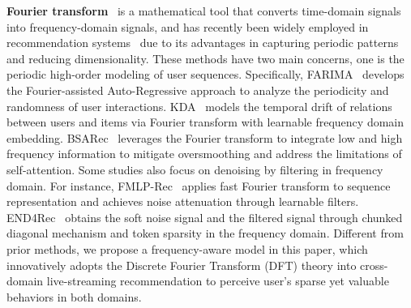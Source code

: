 \textbf{Fourier transform}~\cite{fft} is a mathematical tool that converts time-domain signals into frequency-domain signals, and has recently been widely employed in recommendation systems~\cite{farima,kda,bsarec,fmlp-rec,end4rec} due to its advantages in capturing periodic patterns and reducing dimensionality.  
These methods have two main concerns, one is the periodic high-order modeling of user sequences. Specifically, FARIMA~\cite{farima} develops the Fourier-assisted Auto-Regressive approach to analyze the periodicity and randomness of user interactions. KDA~\cite{kda} models the temporal drift of relations between users and items via Fourier transform with learnable frequency domain embedding. BSARec~\cite{bsarec} leverages the Fourier transform to integrate low and high frequency information to mitigate oversmoothing and address the limitations of self-attention. Some studies also focus on denoising by filtering in frequency domain. For instance, FMLP-Rec~\cite{fmlp-rec} applies fast Fourier transform to sequence representation and achieves noise attenuation through learnable filters. END4Rec~\cite{end4rec} obtains the soft noise signal and the filtered signal through chunked diagonal mechanism and token sparsity in the frequency domain. Different from prior methods, we propose a frequency-aware model in this paper, which innovatively adopts the Discrete Fourier Transform (DFT) theory into cross-domain live-streaming recommendation to perceive user's sparse yet valuable behaviors in both domains.